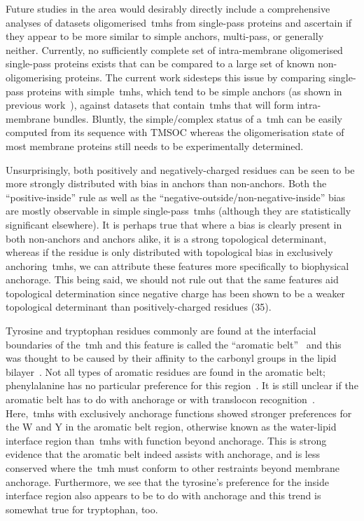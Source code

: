 Future studies in the area would desirably directly include a comprehensive analyses of datasets oligomerised~\gls{tmh}s from single\--pass proteins and ascertain if they appear to be more similar to simple anchors, multi\--pass, or generally neither.
Currently, no sufficiently complete set of intra-membrane oligomerised single\--pass proteins exists that can be compared to a large set of known non-oligomerising proteins.
The current work sidesteps this issue by comparing single\--pass proteins with simple~\gls{tmh}s, which tend to be simple anchors (as shown in previous work~\cite{Wong2011, Wong2012}), against datasets that contain~\gls{tmh}s that will form intra-membrane bundles.
Bluntly, the simple/complex status of a~\gls{tmh} can be easily computed from its sequence with TMSOC whereas the oligomerisation state of most membrane proteins still needs to be experimentally determined.

Unsurprisingly, both positively and negatively\--charged residues can be seen to be more strongly distributed with bias in anchors than non-anchors.
Both the ``positive-inside'' rule as well as the ``negative-outside/non-negative-inside'' bias are mostly observable in simple single\--pass~\gls{tmh}s (although they are statistically significant elsewhere).
It is perhaps true that where a bias is clearly present in both non-anchors and anchors alike, it is a strong topological determinant, whereas if the residue is only distributed with topological bias in exclusively anchoring~\gls{tmh}s, we can attribute these features more specifically to biophysical anchorage.
This being said, we should not rule out that the same features aid topological determination since negative charge has been shown to be a weaker topological determinant than positively\--charged residues (35).

Tyrosine and tryptophan residues commonly are found at the interfacial boundaries of the~\gls{tmh} and this feature is called the ``aromatic belt''~\cite{Sharpe2010, Baeza-Delgado2013, Granseth2005, Nilsson2005a, Hessa2005} and this was thought to be caused by their affinity to the carbonyl groups in the lipid bilayer~\cite{Killian2000}.
Not all types of aromatic residues are found in the aromatic belt; phenylalanine has no particular preference for this region~\cite{Granseth2005, Braun1999}.
It is still unclear if the aromatic belt has to do with anchorage or with translocon recognition~\cite{Baeza-Delgado2013}.
Here,~\gls{tmh}s with exclusively anchorage functions showed stronger preferences for the W and Y in the aromatic belt region, otherwise known as the water-lipid interface region than~\gls{tmh}s with function beyond anchorage.
This is strong evidence that the aromatic belt indeed assists with anchorage, and is less conserved where the~\gls{tmh} must conform to other restraints beyond membrane anchorage.
Furthermore, we see that the tyrosine's preference for the inside interface region also appears to be to do with anchorage and this trend is somewhat true for tryptophan, too.

